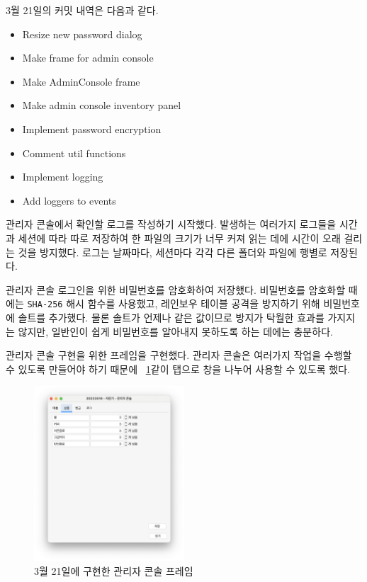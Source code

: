 \documentclass{oblivoir}
\newcommand{\figref}[1]{\figurename~\ref{#1}}
\begin{document}
    3월 21일의 커밋 내역은 다음과 같다.
    \begin{itemize}
        \item Resize new password dialog
        \item Make frame for admin console
        \item Make AdminConsole frame
        \item Make admin console inventory panel
        \item Implement password encryption
        \item Comment util functions
        \item Implement logging
        \item Add loggers to events
    \end{itemize}

    관리자 콘솔에서 확인할 로그를 작성하기 시작했다.
    발생하는 여러가지 로그들을 시간과 세션에 따라 따로 저장하여 한 파일의 크기가 너무 커져 읽는 데에 시간이 오래 걸리는 것을 방지했다.
    로그는 날짜마다, 세션마다 각각 다른 폴더와 파일에 행별로 저장된다.

    관리자 콘솔 로그인을 위한 비밀번호를 암호화하여 저장했다.
    비밀번호를 암호화할 때에는 \texttt{SHA-256} 해시 함수를 사용했고,
    레인보우 테이블 공격을 방지하기 위해 비밀번호에 솔트를 추가했다.
    물론 솔트가 언제나 같은 값이므로 방지가 탁월한 효과를 가지지는 않지만,
    일반인이 쉽게 비밀번호를 알아내지 못하도록 하는 데에는 충분하다.

    관리자 콘솔 구현을 위한 프레임을 구현했다.
    관리자 콘솔은 여러가지 작업을 수행할 수 있도록 만들어야 하기 때문에
    \figref{fig:0321-admin-console}\와 같이 탭으로 창을 나누어 사용할 수 있도록 했다.
    \begin{figure}[h]
        \centering
        \includegraphics[width=0.5\textwidth]{images/dev-snapshop/0321-admin-console}
        \caption{3월 21일에 구현한 관리자 콘솔 프레임}
        \label{fig:0321-admin-console}
    \end{figure}
\end{document}
